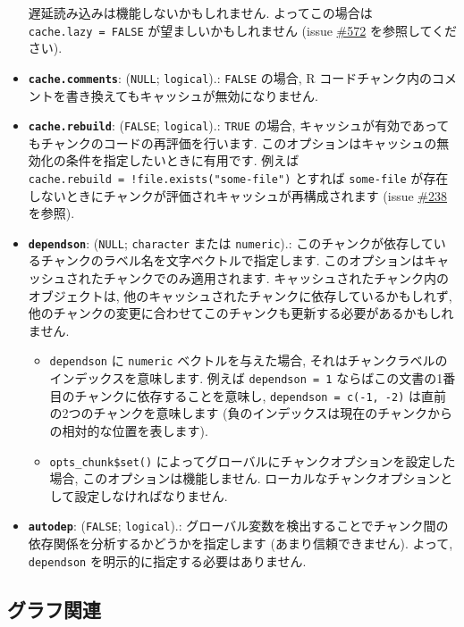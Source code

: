 \documentclass[
  xelatex,ja=standard,jafont=noto]{bxjsreport}
\providecommand{\tightlist}{%
  \setlength{\itemsep}{0pt}\setlength{\parskip}{0pt}}
\begin{document}
\begin{itemize}
  遅延読み込みは機能しないかもしれません. よってこの場合は
  \texttt{cache.lazy\ =\ FALSE} が望ましいかもしれません (issue
  \href{https://github.com/yihui/knitr/issues/572}{\#572}
  を参照してください).
\item
  \textbf{\texttt{cache.comments}}: (\texttt{NULL}; \texttt{logical}).:
  \texttt{FALSE} の場合, R
  コードチャンク内のコメントを書き換えてもキャッシュが無効になりません.
\item
  \textbf{\texttt{cache.rebuild}}: (\texttt{FALSE}; \texttt{logical}).:
  \texttt{TRUE} の場合,
  キャッシュが有効であってもチャンクのコードの再評価を行います.
  このオプションはキャッシュの無効化の条件を指定したいときに有用です.
  例えば \texttt{cache.rebuild\ =\ !file.exists("some-file")} とすれば
  \texttt{some-file}
  が存在しないときにチャンクが評価されキャッシュが再構成されます (issue
  \href{https://github.com/yihui/knitr/issues/238}{\#238} を参照).
\item
  \textbf{\texttt{dependson}}: (\texttt{NULL}; \texttt{character} または
  \texttt{numeric}).:
  このチャンクが依存しているチャンクのラベル名を文字ベクトルで指定します.
  このオプションはキャッシュされたチャンクでのみ適用されます.
  キャッシュされたチャンク内のオブジェクトは,
  他のキャッシュされたチャンクに依存しているかもしれず,
  他のチャンクの変更に合わせてこのチャンクも更新する必要があるかもしれません.

  \begin{itemize}
  \tightlist
  \item
    \texttt{dependson} に \texttt{numeric} ベクトルを与えた場合,
    それはチャンクラベルのインデックスを意味します. 例えば
    \texttt{dependson\ =\ 1}
    ならばこの文書の1番目のチャンクに依存することを意味し,
    \texttt{dependson\ =\ c(-1,\ -2)} は直前の2つのチャンクを意味します
    (負のインデックスは現在のチャンクからの相対的な位置を表します).
  \item
    \texttt{opts\_chunk\$set()}
    によってグローバルにチャンクオプションを設定した場合,
    このオプションは機能しません.
    ローカルなチャンクオプションとして設定しなければなりません.
  \end{itemize}
\item
  \textbf{\texttt{autodep}}: (\texttt{FALSE}; \texttt{logical}).:
  グローバル変数を検出することでチャンク間の依存関係を分析するかどうかを指定します
  (あまり信頼できません). よって, \texttt{dependson}
  を明示的に指定する必要はありません.
\end{itemize}

\hypertarget{plots}{%
\subsection{グラフ関連}\label{plots}}
\end{document}
